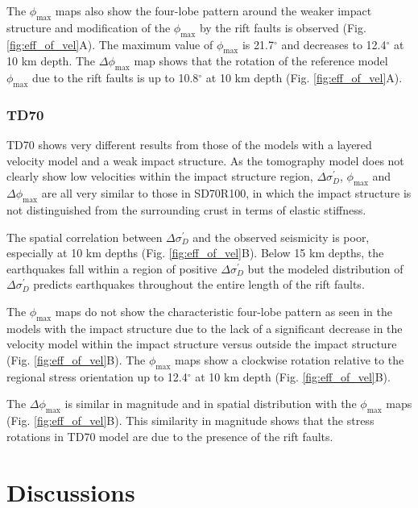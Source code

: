 \documentclass[draft]{agujournal2018}
\begin{document}
The $\phi_{\max}$ maps also show the four-lobe pattern around the weaker impact structure and modification of the $\phi_{\max}$ by the rift faults is observed (Fig. \ref{fig:eff_of_vel}A). The maximum value of $\phi_{\max}$ is 21.7$^\circ$ and decreases to 12.4$^\circ$ at 10 km depth. The $\Delta\phi_{\max}$ map shows that the rotation of the reference model $\phi_{\max}$ due to the rift faults is up to 10.8$^\circ$ at 10 km depth (Fig. \ref{fig:eff_of_vel}A).

\subsubsection{TD70}
TD70 shows very different results from those of the models with a layered velocity model and a weak impact structure. As the tomography model does not clearly show low velocities within the impact structure region, $\Delta\sigma_{D}^{\prime}$, $\phi_{\max}$ and $\Delta\phi_{\max}$ are all very similar to those in SD70R100, in which the impact structure is not distinguished from the surrounding crust in terms of elastic stiffness.

The spatial correlation between $\Delta\sigma_{D}^{\prime}$ and the observed seismicity is poor, especially at 10 km depths (Fig. \ref{fig:eff_of_vel}B). Below 15 km depths, the earthquakes fall within a region of positive $\Delta\sigma_{D}^{\prime}$ but the modeled distribution of $\Delta\sigma_{D}^{\prime}$ predicts earthquakes throughout the entire length of the rift faults. 

The $\phi_{\max}$ maps do not show the characteristic four-lobe pattern as seen in the models with the impact structure due to the lack of a significant decrease in the velocity model within the impact structure versus outside the impact structure (Fig. \ref{fig:eff_of_vel}B). The $\phi_{\max}$ maps show a clockwise rotation relative to the regional stress orientation up to 12.4$^\circ$ at 10 km depth (Fig. \ref{fig:eff_of_vel}B).

The $\Delta\phi_{\max}$ is similar in magnitude and in spatial distribution with the $\phi_{\max}$ maps (Fig. \ref{fig:eff_of_vel}B). This similarity in magnitude shows that the stress rotations in TD70 model are due to the presence of the rift faults.

\section{Discussions}
\end{document}
